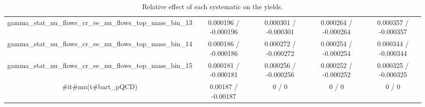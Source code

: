 \documentclass[10pt]{article}
\begin{document}
\begin{table}[htbp]
\begin{center}
\begin{tabular}{|c|c|c|c|c|}
  gamma_stat_nu_flows_cr_ee_nu_flows_top_mass_bin_13 & 0.000196 / -0.000196 & 0.000301 / -0.000301 & 0.000264 / -0.000264 & 0.000357 / -0.000357 \\ 
  gamma_stat_nu_flows_cr_ee_nu_flows_top_mass_bin_14 & 0.000186 / -0.000186 & 0.000272 / -0.000272 & 0.000254 / -0.000254 & 0.000344 / -0.000344 \\ 
  gamma_stat_nu_flows_cr_ee_nu_flows_top_mass_bin_15 & 0.000181 / -0.000181 & 0.000256 / -0.000256 & 0.000252 / -0.000252 & 0.000325 / -0.000325 \\ 
  #it{#mu}(t#bar{t}_{pQCD}) & 0.00187 / -0.00187 & 0 / 0 & 0 / 0 & 0 / 0 \\ 
\hline 
\end{tabular} 
\caption{Relative effect of each systematic on the yields.} 
\end{center} 
\end{table} 
\end{document}
